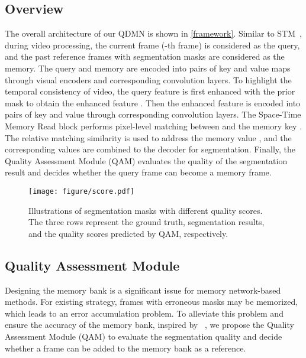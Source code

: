\documentclass[runningheads]{llncs}
\begin{document}
%
 
\subsection{Overview}\label{overview}
    The overall architecture of our QDMN is shown in \cref{framework}. 
    Similar to STM~\cite{stm}, during video processing, the current frame (-th frame) is considered as the query, and the past reference frames with segmentation masks are considered as the memory.
    The query and memory are encoded into pairs of key and value maps through visual encoders and corresponding convolution layers.
To highlight the temporal consistency of video, the query feature  is first enhanced with the prior mask to obtain the enhanced feature . Then the enhanced feature is encoded into pairs of key  and value  through corresponding convolution layers.
    The Space-Time Memory Read block performs pixel-level matching between  and the memory key .
    The relative matching similarity is used to address the memory value , and the corresponding values are combined to the decoder for segmentation.
    Finally, the Quality Assessment Module (QAM) evaluates the quality of the segmentation result and decides whether the query frame can become a memory frame.
    \begin{figure*}[t]
      \centering
      \texttt{[image: figure/score.pdf]}
      \caption{Illustrations of segmentation masks with different quality scores. 
      The three rows represent the ground truth, segmentation results, and the quality scores predicted by QAM, respectively.}
      
      \label{figure score}
    \end{figure*}
   
     
\subsection{Quality Assessment Module}\label{QAM}
    Designing the memory bank is a significant issue for memory network-based methods. 
    For existing strategy, frames with erroneous masks may be memorized, which leads to an error accumulation problem.
    To alleviate this problem and ensure the accuracy of the memory bank, inspired by ~\cite{msrcnn,iou-net}, we propose the Quality Assessment Module (QAM) to evaluate the segmentation quality and decide whether a frame can be added to the memory bank as a reference.
    
\end{document}
